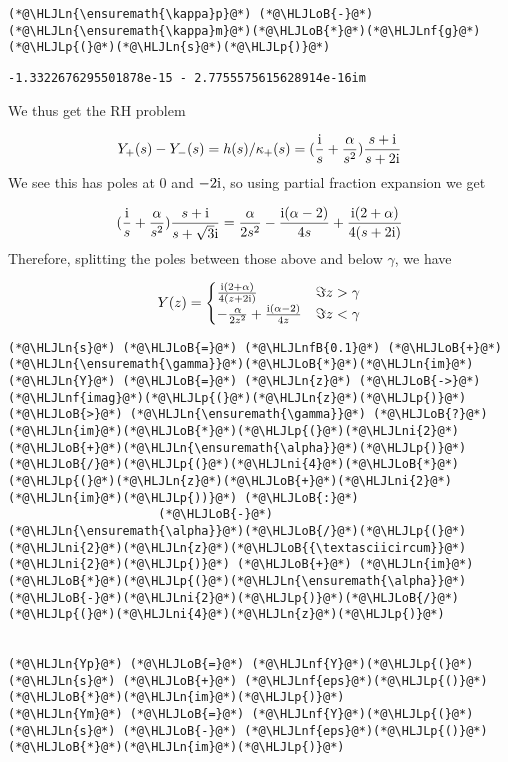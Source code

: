 \documentclass[12pt,landscape]{article}
\newcommand{\HLJLn}[1]{#1}
\newcommand{\HLJLnf}[1]{\textcolor[RGB]{66,102,213}{#1}}
\newcommand{\HLJLnfB}[1]{\textcolor[RGB]{59,151,46}{#1}}
\newcommand{\HLJLni}[1]{\textcolor[RGB]{59,151,46}{#1}}
\newcommand{\HLJLoB}[1]{\textcolor[RGB]{102,102,102}{\textbf{#1}}}
\newcommand{\HLJLp}[1]{#1}
\def\I{ {\rm i} }
\begin{document}
{\begin{lstlisting}
(*@\HLJLn{\ensuremath{\kappa}p}@*) (*@\HLJLoB{-}@*) (*@\HLJLn{\ensuremath{\kappa}m}@*)(*@\HLJLoB{*}@*)(*@\HLJLnf{g}@*)(*@\HLJLp{(}@*)(*@\HLJLn{s}@*)(*@\HLJLp{)}@*)
\end{lstlisting}

\begin{lstlisting}
-1.3322676295501878e-15 - 2.7755575615628914e-16im
\end{lstlisting}


We thus get the RH problem

\[
Y_+(s) - Y_-(s) = h(s)/\kappa_+(s) =  ({\I \over s} + {\alpha \over s^2})  {s + \I  \over s + 2 \I}
\]
We see this has poles at $0$ and $-2 \I$, so using partial fraction expansion we get

\[
({\I \over s} + {\alpha \over s^2})  {s + \I  \over s + \sqrt{3} \I} =
{\alpha \over 2 s^2}- {\I (\alpha-2) \over 4 s}  +{\I (2+\alpha) \over 4 (s+2 \I)}
\]
Therefore, splitting the poles between those above and below $\gamma$, we have

\[
Y(z) = \begin{cases}
 {\I (2+\alpha) \over 4 (z+2 \I)} & \Im z > \gamma \\
-{\alpha \over 2 z^2}+{\I (\alpha-2) \over 4 z} & \Im z < \gamma
\end{cases}
\]

\begin{lstlisting}
(*@\HLJLn{s}@*) (*@\HLJLoB{=}@*) (*@\HLJLnfB{0.1}@*) (*@\HLJLoB{+}@*) (*@\HLJLn{\ensuremath{\gamma}}@*)(*@\HLJLoB{*}@*)(*@\HLJLn{im}@*)
(*@\HLJLn{Y}@*) (*@\HLJLoB{=}@*) (*@\HLJLn{z}@*) (*@\HLJLoB{->}@*) (*@\HLJLnf{imag}@*)(*@\HLJLp{(}@*)(*@\HLJLn{z}@*)(*@\HLJLp{)}@*) (*@\HLJLoB{>}@*) (*@\HLJLn{\ensuremath{\gamma}}@*) (*@\HLJLoB{?}@*) (*@\HLJLn{im}@*)(*@\HLJLoB{*}@*)(*@\HLJLp{(}@*)(*@\HLJLni{2}@*)(*@\HLJLoB{+}@*)(*@\HLJLn{\ensuremath{\alpha}}@*)(*@\HLJLp{)}@*)(*@\HLJLoB{/}@*)(*@\HLJLp{(}@*)(*@\HLJLni{4}@*)(*@\HLJLoB{*}@*)(*@\HLJLp{(}@*)(*@\HLJLn{z}@*)(*@\HLJLoB{+}@*)(*@\HLJLni{2}@*)(*@\HLJLn{im}@*)(*@\HLJLp{))}@*) (*@\HLJLoB{:}@*)
                     (*@\HLJLoB{-}@*) (*@\HLJLn{\ensuremath{\alpha}}@*)(*@\HLJLoB{/}@*)(*@\HLJLp{(}@*)(*@\HLJLni{2}@*)(*@\HLJLn{z}@*)(*@\HLJLoB{{\textasciicircum}}@*)(*@\HLJLni{2}@*)(*@\HLJLp{)}@*) (*@\HLJLoB{+}@*) (*@\HLJLn{im}@*)(*@\HLJLoB{*}@*)(*@\HLJLp{(}@*)(*@\HLJLn{\ensuremath{\alpha}}@*)(*@\HLJLoB{-}@*)(*@\HLJLni{2}@*)(*@\HLJLp{)}@*)(*@\HLJLoB{/}@*)(*@\HLJLp{(}@*)(*@\HLJLni{4}@*)(*@\HLJLn{z}@*)(*@\HLJLp{)}@*)


(*@\HLJLn{Yp}@*) (*@\HLJLoB{=}@*) (*@\HLJLnf{Y}@*)(*@\HLJLp{(}@*)(*@\HLJLn{s}@*) (*@\HLJLoB{+}@*) (*@\HLJLnf{eps}@*)(*@\HLJLp{()}@*)(*@\HLJLoB{*}@*)(*@\HLJLn{im}@*)(*@\HLJLp{)}@*)
(*@\HLJLn{Ym}@*) (*@\HLJLoB{=}@*) (*@\HLJLnf{Y}@*)(*@\HLJLp{(}@*)(*@\HLJLn{s}@*) (*@\HLJLoB{-}@*) (*@\HLJLnf{eps}@*)(*@\HLJLp{()}@*)(*@\HLJLoB{*}@*)(*@\HLJLn{im}@*)(*@\HLJLp{)}@*)


\end{lstlisting}}
\end{document}

